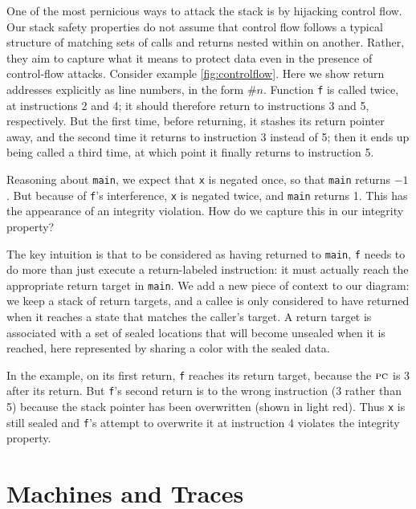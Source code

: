 \documentclass[acmsmall,review,anonymous]{acmart}\settopmatter{printfolios=true,printccs=false,printacmref=false}
\begin{document}
\label{sec:controlflow} %

One of the most pernicious ways to attack the stack is by hijacking control flow.
Our stack safety properties do not assume that control flow follows a typical structure
of matching sets of calls and returns nested within on another.
Rather, they aim to capture what it means to protect data even in the presence of control-flow attacks.
Consider example \ref{fig:controlflow}.
Here we show return addresses explicitly as line numbers, in the form $\#n$.
Function {\tt f} is called twice, at instructions 2 and 4; it should therefore return to instructions
3 and 5, respectively. But the first time, before returning, it stashes its
return pointer away, and the second time it returns to instruction 3 instead of 5; then it ends
up being called a third time, at which point it finally returns to instruction 5.

Reasoning about {\tt main}, we expect that {\tt x} is negated once, so that {\tt main} returns
$-1$. But because of {\tt f}'s interference, {\tt x} is negated twice, and {\tt main} returns 1.
This has the appearance of an integrity violation.  How do we capture this in our
integrity property?

The key intuition is that to be considered as having returned to {\tt main}, {\tt f} needs
to do more than just execute a return-labeled instruction: it must actually reach the
appropriate return target in {\tt main}.
We add a new piece of context to our diagram: we keep a stack of return targets, and a callee is
only considered to have returned when it reaches a state that matches the caller's target.
A return target is associated with a set of sealed locations that will become unsealed
when it is reached, here represented by sharing a color with the sealed data.

In the example, on its first return, {\tt f} reaches its return target, because the
\(\textsc{pc}\) is 3 after its return. But {\tt f}'s second return is to the wrong instruction
(3 rather than 5) because the stack pointer has been overwritten (shown in light red).
Thus {\tt x} is still sealed and {\tt f}'s attempt to overwrite it at instruction 4
violates the integrity property.

\section{Machines and Traces}
\label{sec:prelim}
\end{document}

